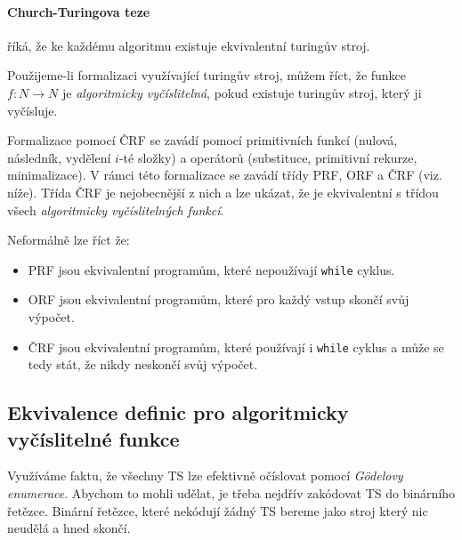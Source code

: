 \documentclass[a4paper]{article}      %
\begin{document}
\paragraph{Church-Turingova teze} říká, že ke každému algoritmu existuje ekvivalentní turingův stroj.

Použijeme-li formalizaci využívající turingův stroj, můžem říct, že funkce $f: N \rightarrow N$ je \emph{algoritmicky vyčíslitelná}, pokud existuje turingův stroj, který ji vyčísluje.  

Formalizace pomocí ČRF se zavádí pomocí primitivních funkcí (nulová, následník, vydělení $i$-té složky) a operátorů (substituce, primitivní rekurze, minimalizace). V rámci této formalizace se zavádí třídy PRF, ORF a ČRF (viz. níže). Třída ČRF je nejobecnější z nich a lze ukázat, že je ekvivalentní s třídou všech \emph{algoritmicky vyčíslitelných funkcí}.

Neformálně lze říct že:
\begin{itemize}
\item PRF jsou ekvivalentní programům, které nepoužívají \verb+while+ cyklus.
\item ORF jsou ekvivalentní programům, které pro každý vstup skončí svůj výpočet.
\item ČRF jsou ekvivalentní programům, které používají i \verb+while+ cyklus a může se tedy stát, že nikdy neskončí svůj výpočet.
\end{itemize}

\subsection{Ekvivalence definic pro algoritmicky vyčíslitelné funkce}
Využíváme faktu, že všechny TS lze efektivně očíslovat pomocí \emph{G\"{o}delovy enumerace}. Abychom to mohli udělat, je třeba nejdřív
zakódovat TS do binárního řetězce. Binární řetězce, které nekódují žádný TS bereme jako stroj který nic neudělá a hned skončí.
\end{document}
